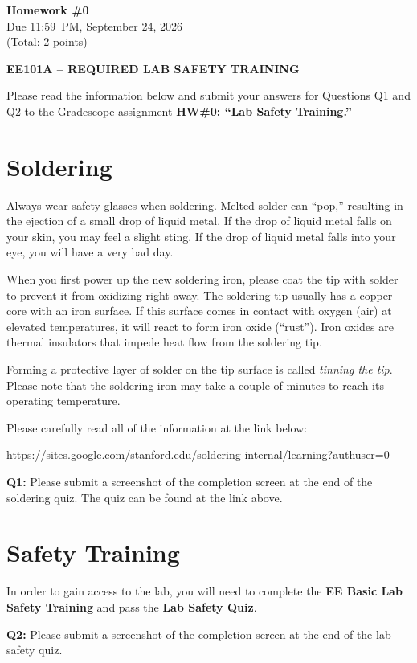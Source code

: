 \documentclass[11pt]{article}
\begin{document}
\begin{center}
    {\Large\bfseries Homework \#0}\\[0.35em]
    {\large Due 11:59~PM, September 24, 2026}\\[0.2em]
    {(Total: 2 points)}
\end{center}

\vspace{0.5em}

\begin{center}
    {\large\bfseries EE101A -- REQUIRED LAB SAFETY TRAINING}
\end{center}

Please read the information below and submit your answers for Questions Q1 and Q2 to the Gradescope assignment \textbf{HW\#0: ``Lab Safety Training.''}

\section*{Soldering}

Always wear safety glasses when soldering. Melted solder can ``pop,'' resulting in the ejection of a small drop of liquid metal. If the drop of liquid metal falls on your skin, you may feel a slight sting. If the drop of liquid metal falls into your eye, you will have a very bad day.

When you first power up the new soldering iron, please coat the tip with solder to prevent it from oxidizing right away. The soldering tip usually has a copper core with an iron surface. If this surface comes in contact with oxygen (air) at elevated temperatures, it will react to form iron oxide (``rust''). Iron oxides are thermal insulators that impede heat flow from the soldering tip.

Forming a protective layer of solder on the tip surface is called \emph{tinning the tip}. Please note that the soldering iron may take a couple of minutes to reach its operating temperature.

Please carefully read all of the information at the link below:

\begin{center}
\url{https://sites.google.com/stanford.edu/soldering-internal/learning?authuser=0}
\end{center}

\textbf{Q1:} Please submit a screenshot of the completion screen at the end of the soldering quiz. The quiz can be found at the link above.

\section*{Safety Training}

In order to gain access to the lab, you will need to complete the \textbf{EE Basic Lab Safety Training} and pass the \textbf{Lab Safety Quiz}.

\textbf{Q2:} Please submit a screenshot of the completion screen at the end of the lab safety quiz.
\end{document}
